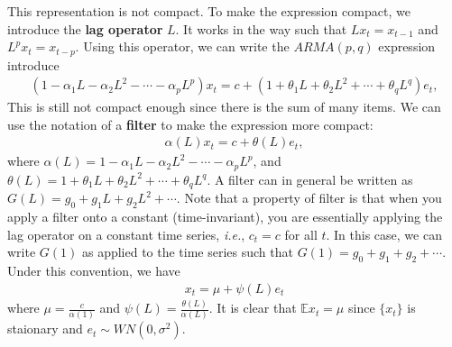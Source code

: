 \documentclass[12pt]{article}
\begin{document}
This representation is not compact. To make the expression compact, we introduce the \textbf{lag operator} $L$. It works in the way such that $L x_t = x_{t-1}$ and $L^p x_t = x_{t-p}$. Using this operator, we can write the $ARMA(p,q)$ expression introduce
\begin{align*}
    (1 - \alpha_1 L - \alpha_2 L^2 - \cdots - \alpha_p L^p) x_t = c + (1 + \theta_1 L + \theta_2 L^2 + \cdots + \theta_q L^q) e_t,
\end{align*}
This is still not compact enough since there is the sum of many items. We can use the notation of a \textbf{filter} to make the expression more compact:
\begin{align*}
    \alpha(L) x_t = c + \theta(L) e_t,
\end{align*}
where $\alpha(L) = 1 - \alpha_1 L - \alpha_2 L^2 - \cdots - \alpha_p L^p$, and $\theta(L) = 1 + \theta_1 L + \theta_2 L^2 + \cdots + \theta_q L^q$. A filter can in general be written as $G(L) = g_0 + g_1 L + g_2 L^2 + \cdots$. Note that a property of filter is that when you apply a filter onto a constant (time-invariant), you are essentially applying the lag operator on a constant time series, \textit{i.e.}, $c_t = c$ for all $t$. In this case, we can write $G(1)$ as applied to the time series such that $G(1) = g_0 + g_1 + g_2 + \cdots$. Under this convention, we have
\begin{align*}
    x_t = \mu + \psi(L) e_t
\end{align*}
where $\mu = \frac{c}{\alpha(1)}$ and $\psi(L) = \frac{\theta(L)}{\alpha(L)}$. It is clear that $\mathbb{E} x_t = \mu$ since $\{x_t\}$ is staionary and $e_t \sim WN(0, \sigma^2)$.
\end{document}

